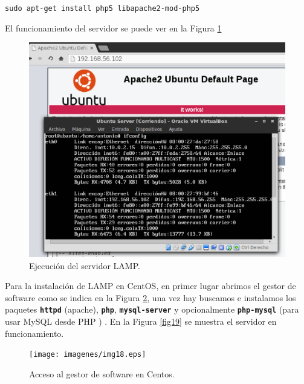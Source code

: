\hskip3.5cm \texttt{sudo apt-get install php5 libapache2-mod-php5}

El funcionamiento del servidor se puede ver en la Figura \ref{fig17}

\begin{figure}[H]
    \begin{center}
        \includegraphics[scale=0.6]{imagenes/img17.eps}
        \caption{Ejecución del servidor LAMP.}
        \label{fig17}
    \end{center}
\end{figure}

Para la instalación de LAMP en CentOS, en primer lugar abrimos el gestor de software como se indica en la Figura \ref{fig18}, una vez hay buscamos e instalamos los paquetes \textbf{\texttt{httpd}} (apache), \textbf{\texttt{php}}, \textbf{\texttt{mysql-server}} y opcionalmente \textbf{\texttt{php-mysql}} (para usar MySQL desde PHP ) \cite{l4}. En la Figura \ref{fig19} se muestra el servidor en funcionamiento.

\begin{figure}[H]
    \begin{center}
        \texttt{[image: imagenes/img18.eps]}
        \caption{Acceso al gestor de software en Centos.}
        \label{fig18}
    \end{center}
\end{figure}

